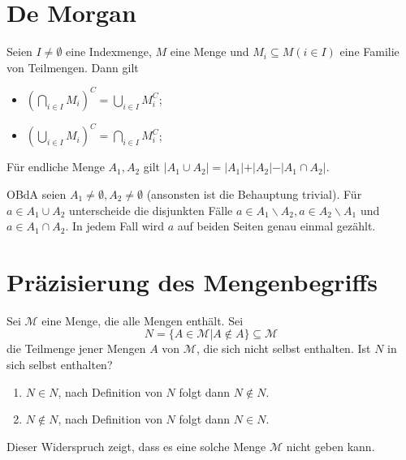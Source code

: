 \section{De Morgan}
 {
	Seien $I \neq \emptyset$ eine Indexmenge, $M$ eine Menge und $M_i \subseteq M (i \in I)$ eine Familie von Teilmengen. Dann gilt
	\begin{itemize}
		\item $\left(\bigcap\limits_{i \in I}M_i\right)^C = \bigcup\limits_{i \in I}M_i^C$;
		\item $\left(\bigcup\limits_{i \in I}M_i\right)^C = \bigcap\limits_{i \in I}M_i^C$;
	\end{itemize}
}
 {
	Für endliche Menge $A_1, A_2$ gilt $\vert A_1 \cup A_2\vert = \vert A_1 \vert + \vert A_2 \vert - \vert A_1 \cap A_2\vert$.
}
\begin{myproof}
	OBdA seien $A_1 \neq \emptyset, A_2 \neq \emptyset$ (ansonsten ist die Behauptung trivial). Für $a \in A_1 \cup A_2$ unterscheide die disjunkten Fälle $a \in A_1 \backslash A_2, a \in A_2 \backslash A_1$ und $a \in A_1 \cap A_2$. In jedem Fall wird $a$ auf beiden Seiten genau einmal gezählt.
\end{myproof}
\section{Präzisierung des Mengenbegriffs}
\begin{myproof}
	Sei $\mathcal{M}$ eine Menge, die alle Mengen enthält. Sei
	$$
	N=\{A \in \mathcal{M} \vert A \notin A\} \subseteq \mathcal{M}
	$$
	die Teilmenge jener Mengen $A$ von $\mathcal{M}$, die sich nicht selbst enthalten. Ist $N$ in sich selbst enthalten?
	\begin{enumerate}
		\item $N \in N$, nach Definition von $N$ folgt dann $N \notin N$. 
		\item $N \notin N$, nach Definition von $N$ folgt dann $N \in N$. 
	\end{enumerate}
	Dieser Widerspruch zeigt, dass es eine solche Menge $\mathcal{M}$ nicht geben kann.
\end{myproof}
